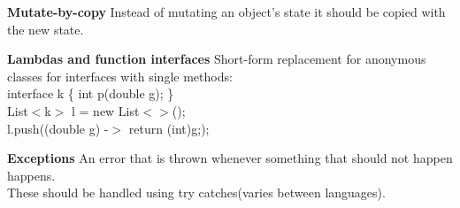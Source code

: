 \documentclass{article}
\begin{document}
\begin{Parallel}[v]{0.49\textwidth}{0.49\textwidth}
{        \textbf{Mutate-by-copy}\newline
        Instead of mutating an object's state it should be copied with the new state.

        \textbf{Lambdas and function interfaces}\newline
        Short-form replacement for anonymous classes for interfaces with single methods:\\
        interface k \{
        int p(double g);
        \}\\
        List$<$k$>$ l = new List$<>$();\\
        l.push((double g) -$>$ {return (int)g;});

        \textbf{Exceptions}\newline
        An error that is thrown whenever something that should not happen happens.\\
        These should be handled using try catches(varies between languages).
    }
    \ParallelPar
\end{Parallel}
\end{document}
